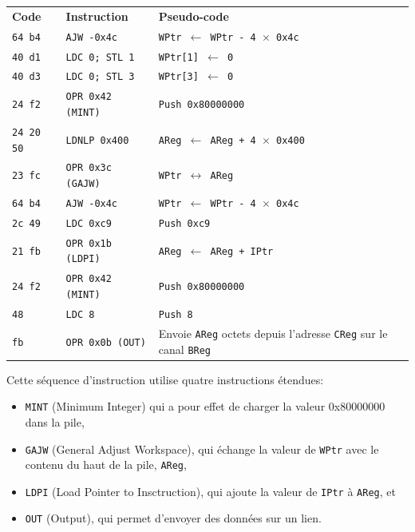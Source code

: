 \documentclass[a4paper,10pt]{article}
\begin{document}
\begin{tabular}{lll}
  \textbf{Code} & \textbf{Instruction} & \textbf{Pseudo-code} \\
  \texttt{64 b4} & \texttt{AJW -0x4c} & \texttt{WPtr $\leftarrow$ WPtr - 4 $\times$ 0x4c} \\
  \texttt{40 d1} & \texttt{LDC 0; STL 1}  & \texttt{WPtr[1] $\leftarrow$ 0} \\
  \texttt{40 d3} & \texttt{LDC 0; STL 3}  & \texttt{WPtr[3] $\leftarrow$ 0} \\
  \texttt{24 f2} & \texttt{OPR 0x42 (MINT)} & \texttt{Push 0x80000000} \\
  \texttt{24 20 50} & \texttt{LDNLP 0x400} & \texttt{AReg $\leftarrow$ AReg + 4 $\times$ 0x400} \\
  \texttt{23 fc} & \texttt{OPR 0x3c (GAJW)} & \texttt{WPtr $\leftrightarrow$ AReg} \\
  \texttt{64 b4} & \texttt{AJW -0x4c} & \texttt{WPtr $\leftarrow$ WPtr - 4 $\times$ 0x4c} \\
  \texttt{2c 49} & \texttt{LDC 0xc9} & \texttt{Push 0xc9} \\
  \texttt{21 fb} & \texttt{OPR 0x1b (LDPI)} & \texttt{AReg $\leftarrow$ AReg + IPtr} \\
  \texttt{24 f2} & \texttt{OPR 0x42 (MINT)} & \texttt{Push 0x80000000} \\
  \texttt{48}    & \texttt{LDC 8} & \texttt{Push 8} \\
  \texttt{fb}    & \texttt{OPR 0x0b (OUT)} & Envoie \texttt{AReg} octets depuis l'adresse \texttt{CReg} sur le canal \texttt{BReg}
\end{tabular}

Cette séquence d'instruction utilise quatre instructions étendues:
\begin{itemize}
  \item \texttt{MINT} (Minimum Integer) qui a pour effet de charger la valeur 0x80000000 dans la pile,
  \item \texttt{GAJW} (General Adjust Workspace), qui échange la valeur de \texttt{WPtr} avec le contenu du haut de la pile, \texttt{AReg},
  \item \texttt{LDPI} (Load Pointer to Insctruction), qui ajoute la valeur de \texttt{IPtr} à \texttt{AReg}, et
  \item \texttt{OUT} (Output), qui permet d'envoyer des données sur un lien.
\end{itemize}
\end{document}
